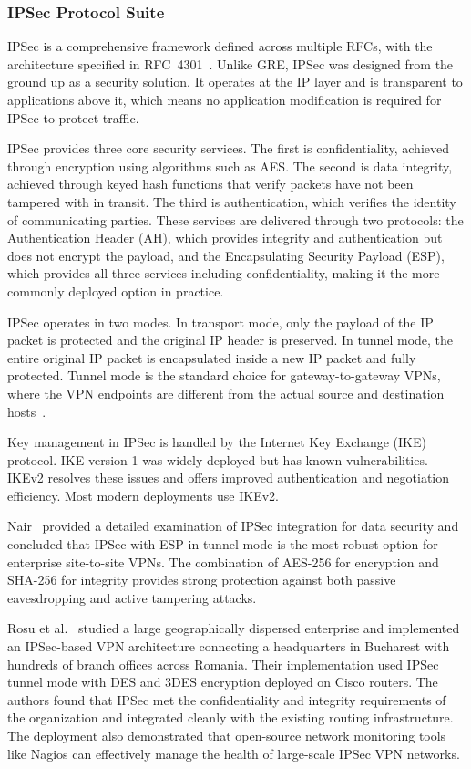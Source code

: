 \documentclass[conference]{IEEEtran}
\begin{document}
\subsubsection{IPSec Protocol Suite}

IPSec is a comprehensive framework defined across multiple RFCs,
with the architecture specified in RFC~4301~\cite{rfc4301}. Unlike
GRE, IPSec was designed from the ground up as a security solution.
It operates at the IP layer and is transparent to applications
above it, which means no application modification is required for
IPSec to protect traffic.

IPSec provides three core security services. The first is
confidentiality, achieved through encryption using algorithms such
as AES. The second is data integrity, achieved through keyed hash
functions that verify packets have not been tampered with in
transit. The third is authentication, which verifies the identity
of communicating parties. These services are delivered through two
protocols: the Authentication Header (AH), which provides integrity
and authentication but does not encrypt the payload, and the
Encapsulating Security Payload (ESP), which provides all three
services including confidentiality, making it the more commonly
deployed option in practice.

IPSec operates in two modes. In transport mode, only the payload
of the IP packet is protected and the original IP header is
preserved. In tunnel mode, the entire original IP packet is
encapsulated inside a new IP packet and fully protected. Tunnel
mode is the standard choice for gateway-to-gateway VPNs, where
the VPN endpoints are different from the actual source and
destination hosts~\cite{rosu2012}.

Key management in IPSec is handled by the Internet Key Exchange
(IKE) protocol. IKE version 1 was widely deployed but has known
vulnerabilities. IKEv2 resolves these issues and offers improved
authentication and negotiation efficiency. Most modern deployments
use IKEv2.

Nair~\cite{nair2024} provided a detailed examination of IPSec
integration for data security and concluded that IPSec with ESP in
tunnel mode is the most robust option for enterprise site-to-site
VPNs. The combination of AES-256 for encryption and SHA-256 for
integrity provides strong protection against both passive
eavesdropping and active tampering attacks.

Rosu et al.~\cite{rosu2012} studied a large geographically
dispersed enterprise and implemented an IPSec-based VPN architecture
connecting a headquarters in Bucharest with hundreds of branch
offices across Romania. Their implementation used IPSec tunnel mode
with DES and 3DES encryption deployed on Cisco routers. The authors
found that IPSec met the confidentiality and integrity requirements
of the organization and integrated cleanly with the existing routing
infrastructure. The deployment also demonstrated that open-source
network monitoring tools like Nagios can effectively manage the
health of large-scale IPSec VPN networks.
\end{document}
